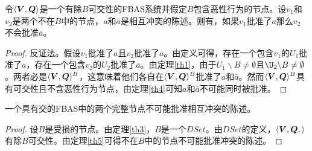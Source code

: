 \begin{theorem}\label{th5}
	令$\langle{\bm V},{\bm Q}\rangle$是一个有除$B${\quorum}可交性的FBAS系统并假定$B$包含恶性行为的节点。设$v_1$和$v_2$是两个不在$B$中的节点，$a$和$\bar a$是相互冲突的陈述。则有，如果$v_1$批准了$a$那么$v_2$不会批准$\bar a$。
\end{theorem}

\begin{proof}
	反证法。假设$v_1$批准了$a$且$v_2$批准了$\bar a$。由定义可得，存在一个包含$v_1$的{\quorum}$U_1$批准了$a$，存在一个包含$v_2$的{\quorum}$U_2$批准了$\bar a$。由定理\ref{th1}，由于$U_1\backslash B\neq \emptyset$且$\U_2\backslash B\neq \emptyset$。两者必是$\langle{\bm V},{\bm Q}\rangle^{B}$，这意味着他们各自在$\langle{\bm V},{\bm Q}\rangle^{B}$批准了$a$和$\bar a$。然而$\langle{\bm V},{\bm Q}\rangle^{B}$具有{\quorum}可交性且不含恶性行为节点，由定理\ref{th4}可知$a$和$\bar a$不可能同时被批准。
\end{proof}

\begin{theorem}\label{th6}
	一个具有{\quorum}交的FBAS中的两个完整节点不可能批准相互冲突的陈述。
\end{theorem}

\begin{proof}
	设$B$是受损的节点。由定理\ref{th3}，$B$是一个$DSet$。由$DSet$的定义，$\langle{\bm V},{\bm Q},\rangle$有除$B${\quorum}可交性。由定理\ref{th5}可得不在$B$中的节点不可能批准冲突的陈述。
\end{proof}